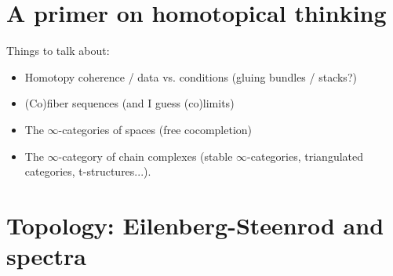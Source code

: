 
\section{A primer on homotopical thinking}
\label{primer}

Things to talk about:
\begin{itemize}
\item Homotopy coherence / data vs. conditions (gluing bundles / stacks?)
\item (Co)fiber sequences (and I guess (co)limits)
\item The $\infty$-categories of spaces (free cocompletion)
\item The $\infty$-category of chain complexes (stable $\infty$-categories, triangulated categories, t-structures...).
\end{itemize}


\section{Topology: Eilenberg-Steenrod and spectra}
\label{topology}

